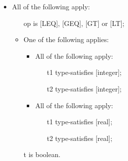 \documentclass{book}
\begin{document}
\begin{itemize}
  \item  All of the following apply:
    \begin{itemize}
    \item  [op] is [LEQ], [GEQ], [GT] or [LT];
    \item  One of the following applies:
      \begin{itemize}
      \item  All of the following apply:
        \begin{itemize}
        \item  [t1] type-satisfies [integer];
        \item  [t2] type-satisfies [integer];
        \end{itemize}
      \item  All of the following apply:
        \begin{itemize}
        \item  [t1] type-satisfies [real];
        \item  [t2] type-satisfies [real];
        \end{itemize}
      \end{itemize}
    \item  [t] is boolean.
    \end{itemize}


\end{itemize}
\end{document}
